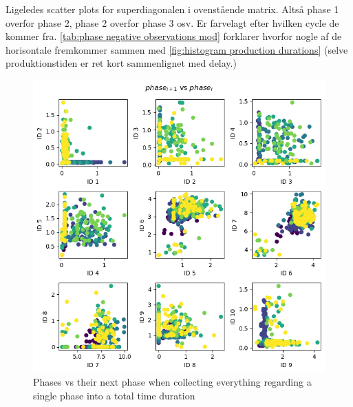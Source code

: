 \documentclass[../Thesis.tex]{subfiles}
\begin{document}
Ligeledes scatter plots for superdiagonalen i ovenstående matrix. Altså phase 1 overfor phase 2, phase 2 overfor phase 3 osv. Er farvelagt efter hvilken cycle de kommer fra. \autoref{tab:phase negative observations mod} forklarer hvorfor nogle af de horisontale fremkommer sammen med \autoref{fig:histogram production durations} (selve produktionstiden er ret kort sammenlignet med delay.)
\begin{figure}[H]
    \centering
    \includegraphics[width=\linewidth]{figures/Multiple cycles data/phase scatter vs next phase.png}
    \caption{Phases vs their next phase when collecting everything regarding a single phase into a total time duration}
\end{figure}







\end{document}
